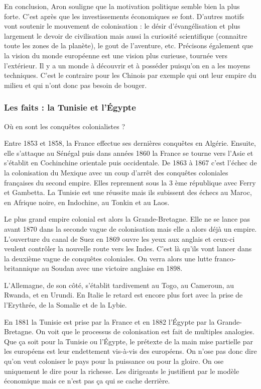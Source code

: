 \documentclass[12pt]{report}
\begin{document}
En conclusion, Aron souligne que la motivation politique semble bien la plus forte. C’est
après que les investissements économiques se font. D’autres motifs vont soutenir le
mouvement de colonisation : le désir d’évangélisation et plus largement le devoir de
civilisation mais aussi la curiosité scientifique (connaitre toute les zones de la planète), le gout
de l’aventure, etc. Précisons également que la vision du monde européenne est une vision
plus curieuse, tournée vers l’extérieur. Il y a un monde à découvrir et à posséder puisqu’on en
a les moyens techniques. C’est le contraire pour les Chinois par exemple qui ont leur empire
du milieu et qui n’ont donc pas besoin de bouger.

\subsubsection{Les faits : la Tunisie et l'Égypte}

Où en sont les conquêtes colonialistes ?

Entre 1853 et 1858, la France effectue ses dernières conquêtes en Algérie. Ensuite, elle
s’attaque au Sénégal puis dans années 1860 la France se tourne vers l’Asie et s’établit en
Cochinchine orientale puis occidentale. De 1863 à 1867 c’est l’échec de la colonisation du
Mexique avec un coup d’arrêt des conquêtes coloniales françaises du second empire. Elles
reprennent sous la 3 ème république avec Ferry et Gambetta. La Tunisie est une réussite mais ils
subissent des échecs au Maroc, en Afrique noire, en Indochine, au Tonkin et au Laos.

Le plus grand empire colonial est alors la Grande-Bretagne. Elle ne se lance pas avant 1870
dans la seconde vague de colonisation mais elle a alors déjà un empire. L’ouverture du canal
de Suez en 1869 ouvre les yeux aux anglais et ceux-ci veulent contrôler la nouvelle route vers
les Indes. C’est là qu’ils vont lancer dans la deuxième vague de conquêtes coloniales. On
verra alors une lutte franco-britannique au Soudan avec une victoire anglaise en 1898.

L’Allemagne, de son côté, s’établit tardivement au Togo, au Cameroun, au Rwanda, et en
Urundi. En Italie le retard est encore plus fort avec la prise de l’Erythrée, de la Somalie et de
la Lybie.

En 1881 la Tunisie est prise par la France et en 1882 l’Égypte par la Grande-Bretagne. On
voit que le processus de colonisation est fait de multiples analogies. Que ça soit pour la
Tunisie ou l’Égypte, le prétexte de la main mise partielle par les européens est leur
endettement vis-à-vis des européens. On n’ose pas donc dire qu’on veut coloniser le pays
pour la puissance ou pour la gloire. On ose uniquement le dire pour la richesse. Les dirigeants
le justifient par le modèle économique mais ce n’est pas ça qui se cache derrière.
\end{document}
